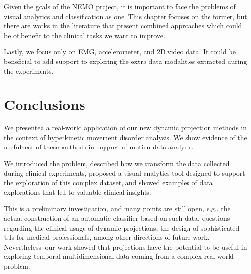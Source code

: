 Given the goals of the NEMO project, it is important to face the problems of visual analytics and classification as one. This chapter focuses on the former, but there are works in the literature that present combined approaches \citep{Graving2020.07.17.207993,rauber_aid} which could be of benefit to the clinical tasks we want to improve. 

Lastly, we focus only on EMG, accelerometer, and 2D video data. It could be beneficial to add support to exploring the extra data modalities extracted during the experiments.


\section{Conclusions}

We presented a real-world application of our new dynamic projection methods in the context of hyperkinetic movement disorder analysis. We show evidence of the usefulness of these methods in support of motion data analysis.

We introduced the problem, described how we transform the data collected during clinical experiments, proposed a visual analytics tool designed to support the exploration of this complex dataset, and showed examples of data explorations that led to valuable clinical insights.

This is a preliminary investigation, and many points are still open, e.g., the actual construction of an automatic classifier based on such data, questions regarding the clinical usage of dynamic projections, the design of sophisticated UIs for medical professionals, among other directions of future work. Nevertheless, our work showed that projections have the potential to be useful in exploring temporal multidimensional data coming from a complex real-world problem.


